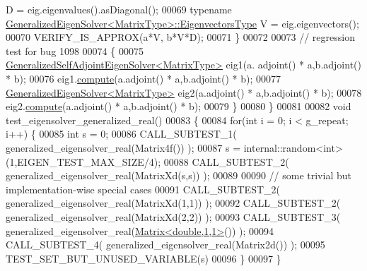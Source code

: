 \begin{DoxyCode}
       D = eig.eigenvalues().asDiagonal();
00069     \textcolor{keyword}{typename} \hyperlink{group___core___module}{GeneralizedEigenSolver<MatrixType>::EigenvectorsType}
       V = eig.eigenvectors();
00070     VERIFY\_IS\_APPROX(a*V, b*V*D);
00071   \}
00072 
00073   \textcolor{comment}{// regression test for bug 1098}
00074   \{
00075     \hyperlink{group___eigenvalues___module_class_eigen_1_1_generalized_self_adjoint_eigen_solver}{GeneralizedSelfAdjointEigenSolver<MatrixType>} eig1(a.
      adjoint() * a,b.adjoint() * b);
00076     eig1.\hyperlink{group___eigenvalues___module_a724764fe196612b752042692156ed023}{compute}(a.adjoint() * a,b.adjoint() * b);
00077     \hyperlink{group___eigenvalues___module_class_eigen_1_1_generalized_eigen_solver}{GeneralizedEigenSolver<MatrixType>} eig2(a.adjoint() * a,b.adjoint() *
       b);
00078     eig2.\hyperlink{group___eigenvalues___module_a275910b47dfe5f40211dcb59cfd68f3c}{compute}(a.adjoint() * a,b.adjoint() * b);
00079   \}
00080 \}
00081 
00082 \textcolor{keywordtype}{void} test\_eigensolver\_generalized\_real()
00083 \{
00084   \textcolor{keywordflow}{for}(\textcolor{keywordtype}{int} i = 0; i < g\_repeat; i++) \{
00085     \textcolor{keywordtype}{int} s = 0;
00086     CALL\_SUBTEST\_1( generalized\_eigensolver\_real(Matrix4f()) );
00087     s = internal::random<int>(1,EIGEN\_TEST\_MAX\_SIZE/4);
00088     CALL\_SUBTEST\_2( generalized\_eigensolver\_real(MatrixXd(s,s)) );
00089 
00090     \textcolor{comment}{// some trivial but implementation-wise special cases}
00091     CALL\_SUBTEST\_2( generalized\_eigensolver\_real(MatrixXd(1,1)) );
00092     CALL\_SUBTEST\_2( generalized\_eigensolver\_real(MatrixXd(2,2)) );
00093     CALL\_SUBTEST\_3( generalized\_eigensolver\_real(\hyperlink{group___core___module_class_eigen_1_1_matrix}{Matrix<double,1,1>}()) );
00094     CALL\_SUBTEST\_4( generalized\_eigensolver\_real(Matrix2d()) );
00095     TEST\_SET\_BUT\_UNUSED\_VARIABLE(s)
00096   \}
00097 \}
\end{DoxyCode}
